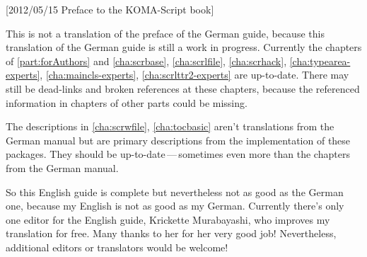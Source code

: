 %
%
%
%
%
%
%
%
%

[2012/05/15 Preface to the KOMA-Script book]



This is not a translation of the preface of the German \KOMAScript{} guide,
because this translation of the German \KOMAScript{} guide is still a work in
progress. Currently the chapters of \autoref{part:forAuthors} and
\autoref{cha:scrbase}, \autoref{cha:scrlfile}, \autoref{cha:scrhack},
\autoref{cha:typearea-experts}, \autoref{cha:maincls-experts},
\autoref{cha:scrlttr2-experts} are up-to-date. There may still be dead-links
and broken references at these chapters, because the referenced information in
chapters of other parts could be missing.

The descriptions in \autoref{cha:scrwfile}, \autoref{cha:tocbasic} aren't
translations from the German manual but are primary descriptions from the
implementation of these packages. They should be up-to-date\,---\,sometimes
even more than the chapters from the German manual.

So this English guide is complete but nevertheless not as good as the German
one, because my English is not as good as my German. Currently there's only
one editor for the English guide, Krickette Murabayashi, who improves my
translation for free. Many thanks to her for her very good job! Nevertheless,
additional editors or translators would be welcome!

\endinput


